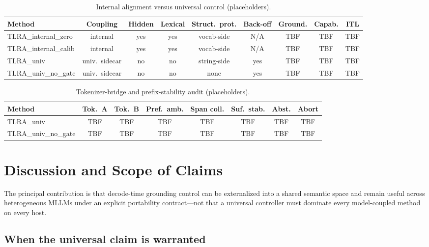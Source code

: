 \begin{table}[t]
  \caption{Internal alignment versus universal control (placeholders).}
  \label{tab:internal}
  \centering
  \footnotesize
  \begin{tabular}{@{}lcccccccc@{}}
    \toprule
    Method & Coupling & Hidden & Lexical & Struct.~prot. & Back-off & Ground. & Capab. & ITL \\
    \midrule
    TLRA\_internal\_zero & internal & yes & yes & vocab-side & N/A & TBF & TBF & TBF \\
    TLRA\_internal\_calib & internal & yes & yes & vocab-side & N/A & TBF & TBF & TBF \\
    TLRA\_univ & univ.\ sidecar & no & no & string-side & yes & TBF & TBF & TBF \\
    TLRA\_univ\_no\_gate & univ.\ sidecar & no & no & none & yes & TBF & TBF & TBF \\
    \bottomrule
  \end{tabular}
\end{table}

\begin{table}[t]
  \caption{Tokenizer-bridge and prefix-stability audit (placeholders).}
  \label{tab:bridge}
  \centering
  \scriptsize
  \begin{tabular}{@{}lccccccc@{}}
    \toprule
    Method & Tok.\ A & Tok.\ B & Pref.\ amb. & Span coll. & Suf.\ stab. & Abst. & Abort \\
    \midrule
    TLRA\_univ & TBF & TBF & TBF & TBF & TBF & TBF & TBF \\
    TLRA\_univ\_no\_gate & TBF & TBF & TBF & TBF & TBF & TBF & TBF \\
    \bottomrule
  \end{tabular}
\end{table}

\section{Discussion and Scope of Claims}
\label{sec:discussion}

The principal contribution is that decode-time grounding control can be externalized into a shared semantic space and remain useful across heterogeneous MLLMs under an explicit portability contract---not that a universal controller must dominate every model-coupled method on every host.

\subsection{When the universal claim is warranted}

